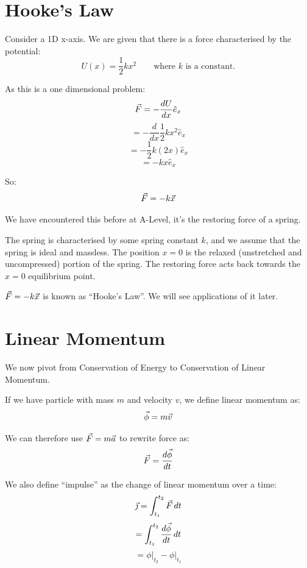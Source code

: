 \section{Hooke's Law}
Consider a 1D x-axis. We are given that there is a force characterised by the potential:
\[
    U(x) = \frac{1}{2}k x^2 \qquad \text{where $k$ is a constant.}
\]

As this is a one dimensional problem:
\[
    \vec{F} = - \frac{dU}{dx} \hat{e}_x
\]
\[
    = - \frac{d}{dx} \frac{1}{2}k x^2 \hat{e}_x
\]
\[
    = - \frac{1}{2} k (2x) \hat{e}_x
\]
\[
    = - kx \hat{e}_x
\]

So:
\[
    \vec{F} = -k \vec{x}
\]

We have encountered this before at A-Level, it's the restoring force of a spring.

The spring is characterised by some spring constant $k$, and we assume that the spring is ideal and massless. The position $x = 0$ is the relaxed (unstretched and uncompressed) portion of the spring. The restoring force acts back towards the $x = 0$ equilibrium point.

$\vec{F} = -k \vec{x}$ is known as ``Hooke's Law''. We will see applications of it later.

\section{Linear Momentum}
We now pivot from Conservation of Energy to Conservation of Linear Momentum. 

If we have particle with mass $m$ and velocity $v$, we define linear momentum as:
\[
    \vec{\phi} = m \vec{v}
\]

We can therefore use $\vec{F} = m \vec{a}$ to rewrite force as:
\[
    \vec{F} = \frac{d \vec{\phi}}{dt}
\]

We also define ``impulse'' as the change of linear momentum over a time:
\[
    \vec{\jmath} = \int_{t_1}^{t_2} \vec{F} \, dt
\]
\[
    = \int_{t_1}^{t_2} \frac{d \vec{\phi}}{dt} \, dt
\]
\[
    = \phi \bigr\rvert_{t_2} - \phi \bigr\rvert_{t_1}
\]


